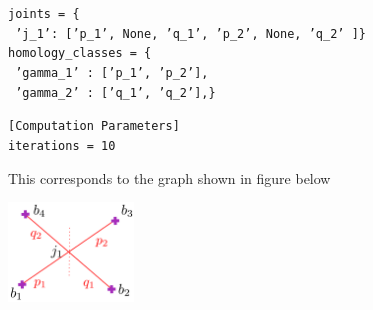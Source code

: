 \documentclass[11pt]{article}
\begin{document}
\noindent\texttt{joints = \{}\\
\noindent\texttt{ \hspace*{10pt} 'j\_1': ['p\_1', None, 'q\_1', 'p\_2', None, 'q\_2' ]\}}\\

\noindent\texttt{homology\_classes = \{}\\
\noindent\texttt{ \hspace*{10pt} 'gamma\_1' : ['p\_1', 'p\_2'],}\\
\noindent\texttt{ \hspace*{10pt} 'gamma\_2' : ['q\_1', 'q\_2'],\}}\\

\smallskip

\noindent\texttt{[Computation Parameters]}\\

\noindent\texttt{iterations = 10}

\medskip

This corresponds to the graph shown in figure below
\begin{center}
\includegraphics[width=0.25\textwidth]{1-herd.pdf}
\end{center}
\end{document}
